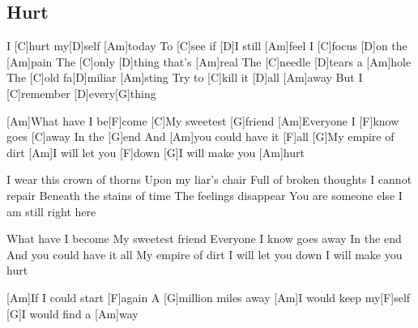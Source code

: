 \subsection*{Hurt   }



\begin{guitar}


I [C]hurt my[D]self [Am]today
To [C]see if [D]I still [Am]feel
I [C]focus [D]on the [Am]pain
The [C]only [D]thing that's [Am]real
The [C]needle [D]tears a [Am]hole
The [C]old fa[D]miliar [Am]sting
Try to [C]kill it [D]all [Am]away
But I [C]remember [D]every[G]thing


[Am]What have I be[F]come
[C]My sweetest [G]friend
[Am]Everyone I [F]know goes [C]away
In the [G]end
And [Am]you could have it [F]all
[G]My empire of dirt
[Am]I will let you [F]down
[G]I will make you [Am]hurt


I wear this crown of thorns
Upon my liar's chair
Full of broken thoughts
I cannot repair
Beneath the stains of time
The feelings disappear
You are someone else
I am still right here


What have I become
My sweetest friend
Everyone I know goes away
In the end
And you could have it all
My empire of dirt
I will let you down
I will make you hurt


[Am]If I could start [F]again
A [G]million miles away
[Am]I would keep my[F]self
[G]I would find a [Am]way
\end{guitar}
